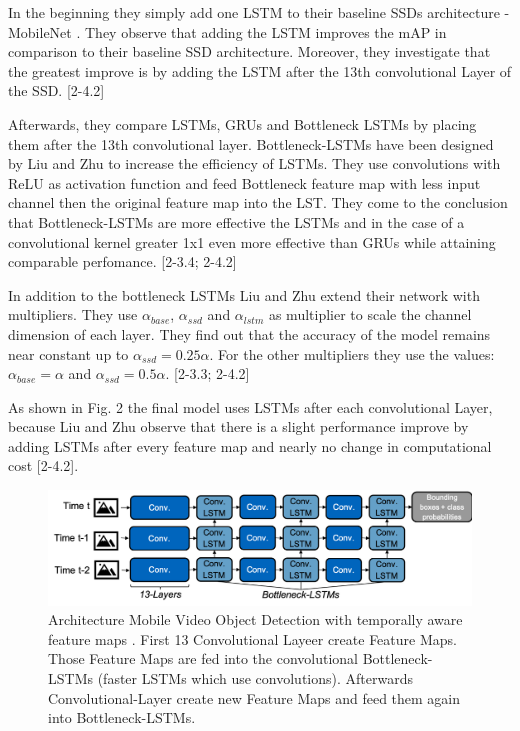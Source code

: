 \documentclass[conference]{IEEEtran}
\begin{document}
In the beginning they simply add one LSTM to their baseline SSDs architecture - MobileNet \cite{b24}. They observe that adding the LSTM improves the mAP in comparison to their baseline SSD architecture. Moreover, they investigate that the greatest improve is by adding the LSTM after the 13th convolutional Layer of the SSD. [2-4.2] \newline

Afterwards, they compare LSTMs, GRUs and Bottleneck LSTMs by placing them after the 13th convolutional layer. Bottleneck-LSTMs have been designed by Liu and Zhu to increase the efficiency of LSTMs. They use convolutions with ReLU as activation function and feed Bottleneck feature map with less input channel then the original feature map into the LST. They come to the conclusion that Bottleneck-LSTMs are more effective the LSTMs and in the case of a convolutional kernel greater 1x1 even more effective than GRUs while attaining comparable perfomance. [2-3.4; 2-4.2]\newline

In addition to the bottleneck LSTMs Liu and Zhu extend their network with multipliers. They use $\alpha_{base}$, $\alpha_{ssd}$ and $\alpha_{lstm}$ as multiplier to scale the channel dimension of each layer. They find out that the accuracy of the model remains near constant up to $\alpha_{ssd}= 0.25 \alpha$. For the other multipliers they use the values: $\alpha_{base} = \alpha$ and $\alpha_{ssd} = 0.5 \alpha$. [2-3.3; 2-4.2] \newline

As shown in Fig. 2 the final model uses LSTMs after each convolutional Layer, because Liu and Zhu observe that there is a slight performance improve by adding LSTMs after every feature map and nearly no change in computational cost [2-4.2].

\begin{figure} [h]
\includegraphics[width=\columnwidth]{Liu_Zhu}
\caption{Architecture Mobile Video Object Detection with temporally aware feature maps \cite{b2}. First 13 Convolutional Layeer create Feature Maps. Those Feature Maps are fed into the convolutional Bottleneck-LSTMs (faster LSTMs which use convolutions). Afterwards Convolutional-Layer create new Feature Maps and feed them again into Bottleneck-LSTMs.}
\end{figure}
\end{document}
